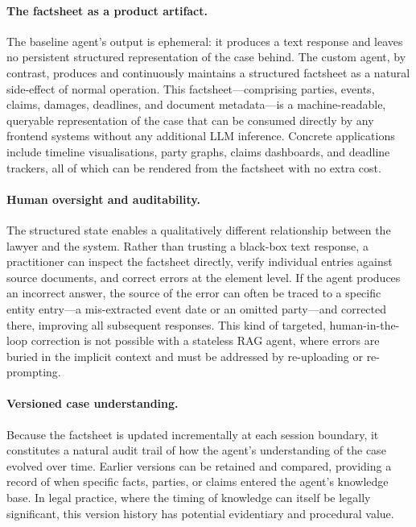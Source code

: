 \paragraph{The factsheet as a product artifact.}
The baseline agent's output is ephemeral: it produces a text response and leaves no
persistent structured representation of the case behind. The custom agent, by contrast,
produces and continuously maintains a structured factsheet as a natural side-effect of
normal operation. This factsheet—comprising parties, events, claims, damages, deadlines,
and document metadata—is a machine-readable, queryable representation of the case that
can be consumed directly by any frontend systems without any additional LLM inference.
Concrete applications include timeline visualisations, party graphs, claims dashboards,
and deadline trackers, all of which can be rendered from the factsheet with no extra
cost.

\paragraph{Human oversight and auditability.}
The structured state enables a qualitatively different relationship between the lawyer
and the system. Rather than trusting a black-box text response, a practitioner can
inspect the factsheet directly, verify individual entries against source documents, and
correct errors at the element level. If the agent produces an incorrect answer, the
source of the error can often be traced to a specific entity entry—a mis-extracted
event date or an omitted party—and corrected there, improving all subsequent responses.
This kind of targeted, human-in-the-loop correction is not possible with a stateless RAG
agent, where errors are buried in the implicit context and must be addressed by
re-uploading or re-prompting.

\paragraph{Versioned case understanding.}
Because the factsheet is updated incrementally at each session boundary, it constitutes
a natural audit trail of how the agent's understanding of the case evolved over time.
Earlier versions can be retained and compared, providing a record of when specific
facts, parties, or claims entered the agent's knowledge base. In legal practice, where
the timing of knowledge can itself be legally significant, this version history has
potential evidentiary and procedural value.

